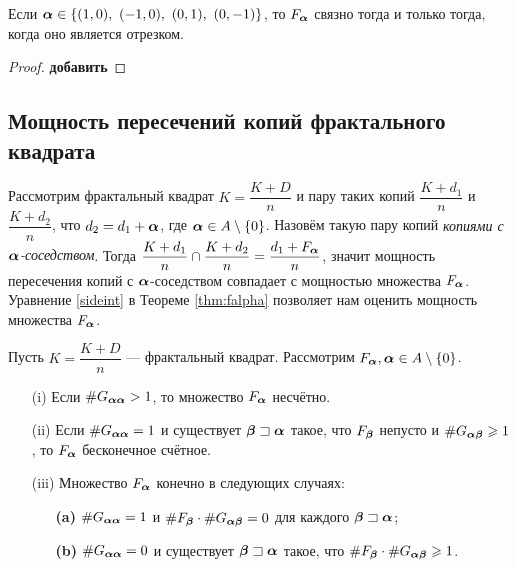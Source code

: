 \begin{corollary}
Если $\bma\in\{(1,0),\ (-1,0),\ (0,1),\ (0,-1)\}$, то $F_{\bm{\alpha}}$ связно тогда и только тогда, когда оно является отрезком.
\end{corollary}

\begin{proof}
{\bf добавить}
\end{proof}


\subsection{Мощность пересечений копий фрактального квадрата}

Рассмотрим фрактальный квадрат $K=\dfrac{K+D}{n}$ и пару таких копий $\dfrac{K+d_1}{n}$ и $\dfrac{K+d_2}{n}$, что $d_2=d_1+{\bm{\alpha}}$, где ${\bm{\alpha}}\in A\setminus\{0\}$.
Назовём такую пару копий {\em копиями с ${\bm{\alpha}}$-соседством}.
Тогда $\dfrac{K+d_1}{n}\cap\dfrac{K+d_2}{n}=\dfrac{d_1+F_{\bm{\alpha}}}{n}$, значит мощность пересечения копий с ${\bm{\alpha}}$-соседством совпадает с мощностью множества $F_{\bm{\alpha}}$.
Уравнение \eqref{sideint} в Теореме \ref{thm:falpha} позволяет нам оценить мощность множества $F_{\bm{\alpha}}$.

\begin{theorem}\label{fin_int}
Пусть $K=\dfrac{K+D}{n}$ --- фрактальный квадрат. Рассмотрим $F_{\bm{\alpha}}, {\bm{\alpha}}\in A\setminus\{0\}$.
\begin{itemize}[nolistsep]
 \item[(i)] Если $\#G_{{\bm{\alpha}}{\bm{\alpha}}}> 1$, то множество $F_{\bm{\alpha}}$ несчётно.
 \item[(ii)] Если $\#G_{{\bm{\alpha}}{\bm{\alpha}}}=1$ и существует ${\bm{\beta}}\sqsupset{\bm{\alpha}}$ такое, что  $F_{\bm{\beta}}$ непусто и $\#G_{{\bm{\alpha}}{\bm{\beta}}}\geqslant1$, то $F_{\bm{\alpha}}$ бесконечное счётное.
 \item[(iii)] Множество $F_{\bm{\alpha}}$ конечно в следующих случаях:
 \begin{itemize}[nolistsep]
 \item[\textbf{(a)}] $\#G_{{\bm{\alpha}}{\bm{\alpha}}}=1$ и $\#F_{\bm{\beta}}\cdot\#G_{{\bm{\alpha}}{\bm{\beta}}}=0$ для каждого ${\bm{\beta}}\sqsupset{\bm{\alpha}}$;
 \item[\textbf{(b)}] $\#G_{{\bm{\alpha}}{\bm{\alpha}}}=0$ и существует ${\bm{\beta}}\sqsupset{\bm{\alpha}}$ такое, что $\#F_{\bm{\beta}}\cdot\#G_{{\bm{\alpha}}{\bm{\beta}}}\geqslant1$.
 \end{itemize}
\end{itemize} 
\end{theorem}

